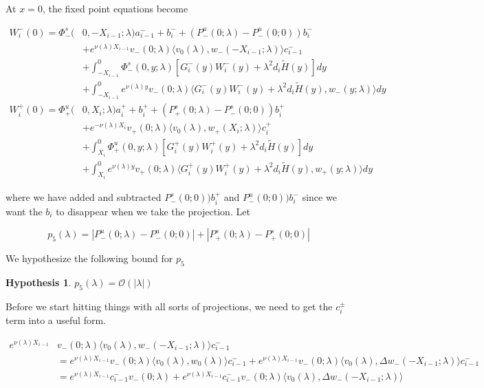 \documentclass[12pt]{article}
\newtheorem{hypothesis}{Hypothesis}
\begin{document}
At $x = 0$, the fixed point equations become

\begin{align*}
W_i^-(0) = \Phi^s_-(&0, -X_{i-1}; \lambda)a_{i-1}^- + b_i^- + (P^u_-(0; \lambda) - P^u_-(0; 0))b_i^- \\
&+ e^{\nu(\lambda)X_{i-1}} v_-(0; \lambda) \langle v_0(\lambda), w_-(-X_{i-1}; \lambda) \rangle c_{i-1}^- \\
&+ \int_{-X_{i-1}}^0 \Phi^s_-(0, y; \lambda) [ G_i^-(y)W_i^-(y) + \lambda^2 d_i \tilde{H}(y) ] dy \\
&+ \int_{-X_{i-1}}^0
e^{\nu(\lambda)y} v_-(0; \lambda) \langle G_i^-(y)W_i^-(y) + \lambda^2 d_i \tilde{H}(y), w_-(y; \lambda) \rangle dy \\
W_i^+(0) = \Phi^u_+(&0, X_i; \lambda)a_i^+ + b_i^+ + (P^s_+(0; \lambda) - P^s_-(0; 0))b_i^+ \\
&+ e^{-\nu(\lambda)  X_i} v_+(0; \lambda) \langle v_0(\lambda), w_+(X_i; \lambda) \rangle c_i^+ \\
&+ \int_{X_i}^0 \Phi^u_+(0, y; \lambda) [ G_i^+(y)W_i^+(y) + \lambda^2 d_i \tilde{H}(y) ] dy \\
&+ \int_{X_i}^0 e^{\nu(\lambda)y} v_+(0; \lambda) \langle G_i^+(y)W_i^+(y) + \lambda^2 d_i \tilde{H}(y), w_+(y; \lambda) \rangle dy
\end{align*}

where we have added and subtracted $P^s_-(0; 0))b_i^+$ and $P^u_-(0; 0))b_i^-$ since we want the $b_i$ to disappear when we take the projection. Let

\begin{equation}\label{p5}
p_5(\lambda) = |P^u_-(0;\lambda) - P^u_-(0; 0)| + |P^s_+(0;\lambda) - P^s_+(0;0)|
\end{equation}

We hypothesize the following bound for $p_5$

\begin{hypothesis}
$p_5(\lambda) = \mathcal{O}(|\lambda|)$
\end{hypothesis}

Before we start hitting things with all sorts of projections, we need to get the $c_i^\pm$ term into a useful form.

\begin{align*}
e^{\nu(\lambda)X_{i-1}} &v_-(0; \lambda) \langle v_0(\lambda), w_-(-X_{i-1}; \lambda) \rangle c_{i-1}^- \\
&= e^{\nu(\lambda)X_{i-1}} v_-(0; \lambda) \langle v_0(\lambda), w_0(\lambda) \rangle c_{i-1}^- + e^{\nu(\lambda)X_{i-1}} v_-(0; \lambda) \langle v_0(\lambda), \Delta w_-(-X_{i-1}; \lambda) \rangle c_{i-1}^- \\
&= e^{\nu(\lambda)X_{i-1}} c_{i-1}^- v_-(0; \lambda) + e^{\nu(\lambda)X_{i-1}} c_{i-1}^- v_-(0; \lambda) \langle v_0(\lambda), \Delta w_-(-X_{i-1}; \lambda) \rangle 
\end{align*}
\end{document}
